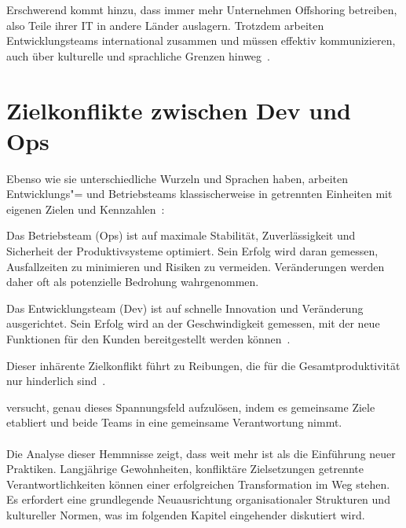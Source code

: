 Erschwerend kommt hinzu, dass immer mehr Unternehmen Offshoring betreiben, also Teile ihrer IT in andere Länder auslagern.
Trotzdem arbeiten Entwicklungsteams international zusammen und müssen effektiv kommunizieren, auch über kulturelle und sprachliche Grenzen hinweg~\cite[7\psq]{aza23}.

\section{Zielkonflikte zwischen Dev und Ops}
Ebenso wie sie unterschiedliche Wurzeln und Sprachen haben, arbeiten Entwicklungs"= und Betriebsteams klassischerweise in getrennten Einheiten mit eigenen Zielen und Kennzahlen~\cite[594]{riu16}:

Das Betriebsteam (Ops) ist auf maximale Stabilität, Zuverlässigkeit und Sicherheit der Produktivsysteme optimiert.
Sein Erfolg wird daran gemessen, Ausfallzeiten zu minimieren und Risiken zu vermeiden.
Veränderungen werden daher oft als potenzielle Bedrohung wahrgenommen.

Das Entwicklungsteam (Dev) ist auf schnelle Innovation und Veränderung ausgerichtet.
Sein Erfolg wird an der Geschwindigkeit gemessen, mit der neue Funktionen für den Kunden bereitgestellt werden können~\cite[128]{ham24}.

Dieser inhärente Zielkonflikt führt zu Reibungen, die für die Gesamtproduktivität nur hinderlich sind~\cites[527]{win23}[14343]{kha22}.

\DO versucht, genau dieses Spannungsfeld aufzulösen, indem es gemeinsame Ziele etabliert und beide Teams in eine gemeinsame Verantwortung nimmt.

\paragraph{}
Die Analyse dieser Hemmnisse zeigt, dass \DO weit mehr ist als die Einführung neuer Praktiken.
Langjährige Gewohnheiten, konfliktäre Zielsetzungen getrennte Verantwortlichkeiten können einer erfolgreichen Transformation im Weg stehen.
Es erfordert eine grundlegende Neuausrichtung organisationaler Strukturen und kultureller Normen, was im folgenden Kapitel eingehender diskutiert wird.